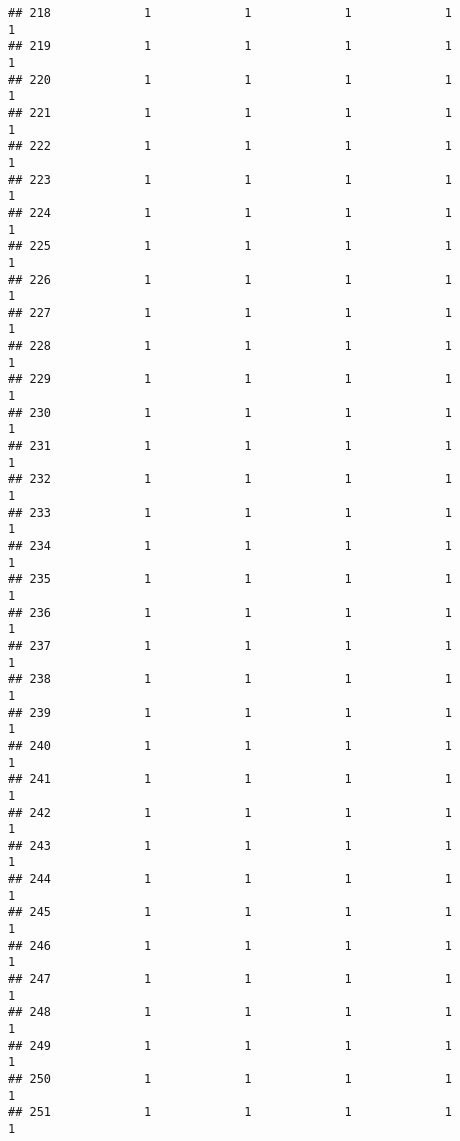 \documentclass[
]{article}
\begin{document}
\begin{verbatim}
## 218             1             1             1             1             1
## 219             1             1             1             1             1
## 220             1             1             1             1             1
## 221             1             1             1             1             1
## 222             1             1             1             1             1
## 223             1             1             1             1             1
## 224             1             1             1             1             1
## 225             1             1             1             1             1
## 226             1             1             1             1             1
## 227             1             1             1             1             1
## 228             1             1             1             1             1
## 229             1             1             1             1             1
## 230             1             1             1             1             1
## 231             1             1             1             1             1
## 232             1             1             1             1             1
## 233             1             1             1             1             1
## 234             1             1             1             1             1
## 235             1             1             1             1             1
## 236             1             1             1             1             1
## 237             1             1             1             1             1
## 238             1             1             1             1             1
## 239             1             1             1             1             1
## 240             1             1             1             1             1
## 241             1             1             1             1             1
## 242             1             1             1             1             1
## 243             1             1             1             1             1
## 244             1             1             1             1             1
## 245             1             1             1             1             1
## 246             1             1             1             1             1
## 247             1             1             1             1             1
## 248             1             1             1             1             1
## 249             1             1             1             1             1
## 250             1             1             1             1             1
## 251             1             1             1             1             1

\end{verbatim}
\end{document}
